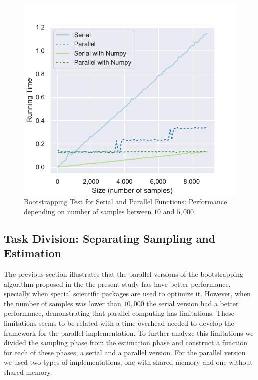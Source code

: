 \documentclass[11pt]{article}
\begin{document}
\begin{figure}[H]
    \begin{center}
        \includegraphics{serialvsparallel_small_test.pdf}
    \end{center}
    \caption{Bootstrapping Test for Serial and Parallel Functions: Performance depending on number of samples between $10$ and $5,000$}\label{fig:SerialVSParallelSmallTest}
\end{figure}

\subsection{Task Division: Separating Sampling and Estimation}\label{subsec:task-divition:-separating-sampling-and-estimation}

The previous section illustrates that the parallel versions of the bootstrapping algorithm proposed in the the present study
has have better performance, specially when special scientific packages are used to optimize it. However, when the number
of samples was lower than $10,000$ the serial version had a better performance, demonstrating that parallel computing has
limitations. These limitations seems to be related with a time overhead needed to develop the framework
for the parallel implementation. To further analyze this limitations we divided the
sampling phase from the estimation phase and construct a function for each of these phases, a serial and a parallel version.
For the parallel version we used two types of implementations, one with shared memory and one without shared memory.
\end{document}
